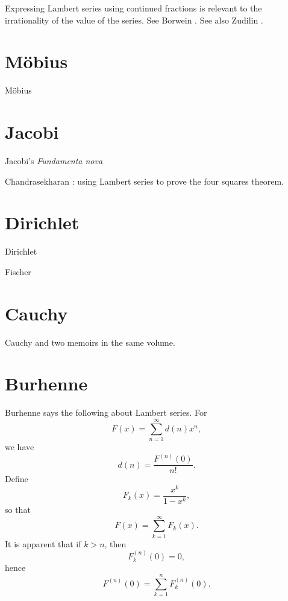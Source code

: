 \documentclass{amsart}
\begin{document}
Expressing Lambert series using continued fractions is relevant to the irrationality of the value of the series. See
Borwein \cite{borwein}. See also Zudilin \cite{zudilin}. 




\section{M\"obius}
M\"obius \cite{mobius}


\section{Jacobi}
Jacobi's {\em Fundamenta nova} \cite[\S 40, 66 and p.~185]{fundamenta}

Chandrasekharan \cite[Chapter X]{chandrasekharan}: using Lambert series to prove the four squares theorem.

\section{Dirichlet}
Dirichlet \cite{dirichlet1838}

Fischer \cite{fischer}

\section{Cauchy}
Cauchy \cite{cauchy1843a} and \cite{cauchy1843b} two memoirs in the same volume.


\section{Burhenne}
Burhenne \cite{burhenne} says the following about Lambert series.
For
\[
F(x) = \sum_{n=1}^\infty d(n) x^n,
\]
we have
\[
d(n) = \frac{F^{(n)}(0)}{n!}.
\]
Define
\[
F_k(x) = \frac{x^k}{1-x^k},
\]
so that
\[
F(x) = \sum_{k=1}^\infty F_k(x).
\]
It is apparent that if $k>n$, then
\[
F_k^{(n)}(0) = 0,
\]
hence
\[
F^{(n)}(0)=
 \sum_{k=1}^n F_k^{(n)}(0).
\]
\end{document}
